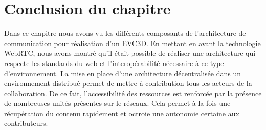 




\section{Conclusion du chapitre}
Dans ce chapitre nous avons vu les différents composants de l'architecture de 
communication pour réalisation d'un \gls{EVC3D}. En mettant en avant la 
technologie WebRTC, nous avons montré qu'il était possible de réaliser une 
architecture qui respecte les standards du web et l'interopérabilité nécessaire à ce 
type d'environnement. La mise en place d'une architecture décentralisée dans un 
environnement distribué permet de mettre à contribution tous les acteurs de la 
collaboration. De ce fait, l'accessibilité des ressources est renforcée par la 
présence de nombreuses unités présentes sur le réseaux. Cela permet à la fois 
une récupération du contenu rapidement et octroie une autonomie certaine aux 
contributeurs. 
